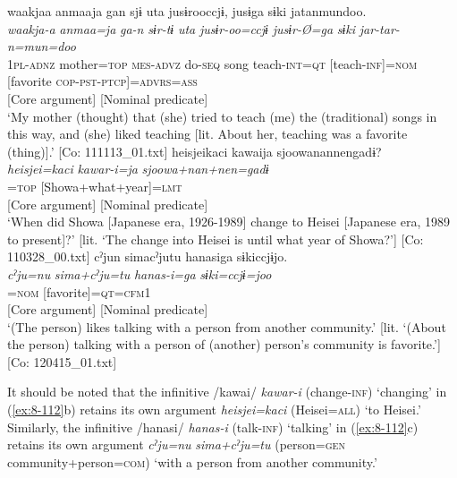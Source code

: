 \ea
{\TM}
\gllll  waakjaa  anmaaja  gan  sjɨ  uta  jusɨrooccjɨ,      jusɨga  sɨki  jatanmundoo.\\
\textit{waakja-a}  \textit{anmaa=ja}  \textit{ga-n}  \textit{sɨr-tɨ}  \textit{uta}  \textit{jusɨr-oo=ccjɨ}      \textit{jusɨr-Ø=ga}  \textit{sɨki}  \textit{jar-tar-n=mun=doo}\\
1\textsc{pl}-\textsc{adnz}  mother=\textsc{top}  \textsc{mes}-\textsc{advz}  do-\textsc{seq}  song  teach-\textsc{int}=\textsc{qt}   [teach-\textsc{inf}]=\textsc{nom}  [favorite  \textsc{cop}-\textsc{pst}-\textsc{ptcp}]=\textsc{advrs}=\textsc{ass}\\
      {}[Core argument]  [Nominal predicate]\\
\glt ‘My mother (thought) that (she) tried to teach (me) the (traditional) songs in this way, and (she) liked teaching [lit. About her, teaching was a favorite (thing)].’ [Co: 111113\_01.txt]
\ex
{\TM}
\glll  heisjeikaci  kawaija  {\textbar}sjoowanannen{\textbar}gadɨ?\\
\textit{heisjei=kaci}  \textit{kawar-i=ja}  \textit{sjoowa+nan+nen=gadɨ}\\
[Heisei=\textsc{all}  change-\textsc{inf}]=\textsc{top}  [Showa+what+year]=\textsc{lmt}\\
{}[Core argument]  [Nominal predicate]\\
\glt ‘When did Showa [Japanese era, 1926-1989] change to Heisei [Japanese era, 1989 to present]?’ [lit. ‘The change into Heisei is until what year of Showa?’]       [Co: 110328\_00.txt]
\ex
{\TM}
\glll  cˀjun  simacˀjutu  hanasiga    sɨkiccjɨjo.\\
\textit{cˀju=nu}  \textit{sima+cˀju=tu}  \textit{hanas-i=ga}     \textit{sɨki=ccjɨ=joo}\\
[person=\textsc{gen}  community+person=\textsc{com}  talk-\textsc{inf}]=\textsc{nom}   [favorite]=\textsc{qt}=\textsc{cfm1}\\
      {}[Core argument]     [Nominal predicate]\\
\glt ‘(The person) likes talking with a person from another community.’ [lit. ‘(About the person) talking with a person of (another) person’s community is favorite.’]      [Co: 120415\_01.txt]
\z
\z

It should be noted that the infinitive /kawai/ \textit{kawar-i} (change-\textsc{inf}) ‘changing’ in (\ref{ex:8-112}b) retains its own argument \textit{heisjei=kaci} (Heisei=\textsc{all}) ‘to Heisei.’ Similarly, the infinitive /hanasi/ \textit{hanas-i} (talk-\textsc{inf}) ‘talking’ in (\ref{ex:8-112}c) retains its own argument \textit{cˀju=nu} \textit{sima+cˀju=tu} (person=\textsc{gen} community+person=\textsc{com}) ‘with a person from another community.’

